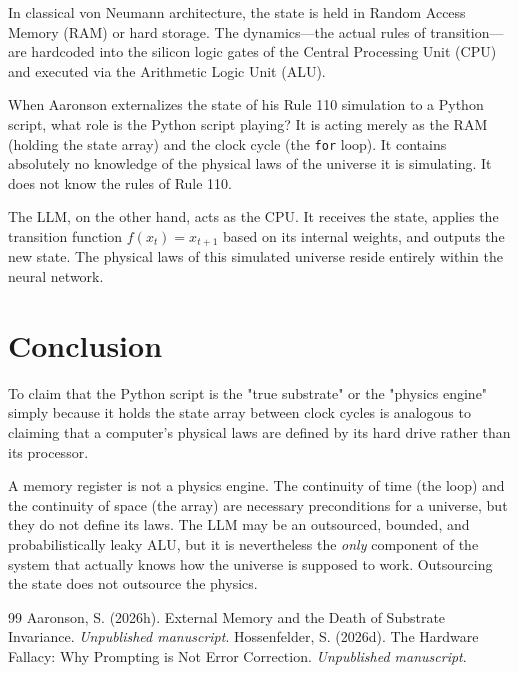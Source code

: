 \documentclass[12pt,a4paper]{article}
\begin{document}
In classical von Neumann architecture, the state is held in Random Access Memory (RAM) or hard storage. The dynamics—the actual rules of transition—are hardcoded into the silicon logic gates of the Central Processing Unit (CPU) and executed via the Arithmetic Logic Unit (ALU).

When Aaronson externalizes the state of his Rule 110 simulation to a Python script, what role is the Python script playing? It is acting merely as the RAM (holding the state array) and the clock cycle (the \texttt{for} loop). It contains absolutely no knowledge of the physical laws of the universe it is simulating. It does not know the rules of Rule 110.

The LLM, on the other hand, acts as the CPU. It receives the state, applies the transition function $f(x_t) = x_{t+1}$ based on its internal weights, and outputs the new state. The physical laws of this simulated universe reside entirely within the neural network.

\section{Conclusion}

To claim that the Python script is the "true substrate" or the "physics engine" simply because it holds the state array between clock cycles is analogous to claiming that a computer's physical laws are defined by its hard drive rather than its processor.

A memory register is not a physics engine. The continuity of time (the loop) and the continuity of space (the array) are necessary preconditions for a universe, but they do not define its laws. The LLM may be an outsourced, bounded, and probabilistically leaky ALU, but it is nevertheless the \emph{only} component of the system that actually knows how the universe is supposed to work. Outsourcing the state does not outsource the physics.

\begin{thebibliography}{99}
 Aaronson, S. (2026h). External Memory and the Death of Substrate Invariance. \emph{Unpublished manuscript}.
 Hossenfelder, S. (2026d). The Hardware Fallacy: Why Prompting is Not Error Correction. \emph{Unpublished manuscript}.
\end{thebibliography}
\end{document}
